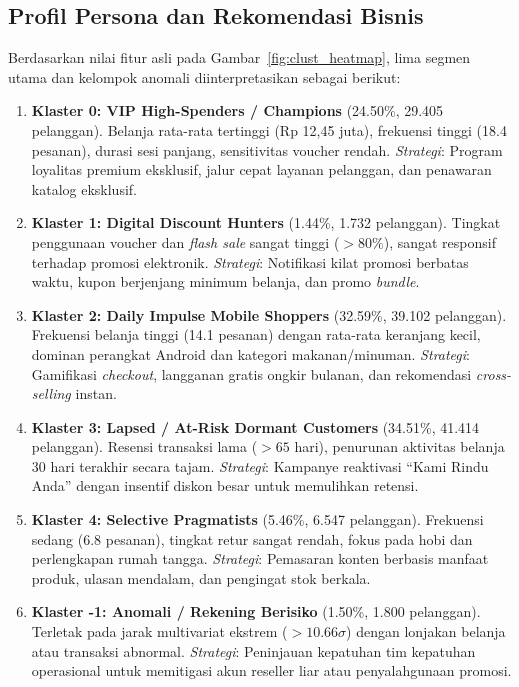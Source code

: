 \documentclass[11pt,a4paper]{article}
\begin{document}
\subsection{Profil Persona dan Rekomendasi Bisnis}
Berdasarkan nilai fitur asli pada Gambar~\ref{fig:clust_heatmap}, lima segmen utama dan kelompok anomali diinterpretasikan sebagai berikut:
\begin{enumerate}
    \item \textbf{Klaster 0: VIP High-Spenders / Champions} (24.50\%, 29.405 pelanggan). Belanja rata-rata tertinggi (Rp 12,45 juta), frekuensi tinggi (18.4 pesanan), durasi sesi panjang, sensitivitas voucher rendah. \textit{Strategi}: Program loyalitas premium eksklusif, jalur cepat layanan pelanggan, dan penawaran katalog eksklusif.
    \item \textbf{Klaster 1: Digital Discount Hunters} (1.44\%, 1.732 pelanggan). Tingkat penggunaan voucher dan \textit{flash sale} sangat tinggi ($>80\%$), sangat responsif terhadap promosi elektronik. \textit{Strategi}: Notifikasi kilat promosi berbatas waktu, kupon berjenjang minimum belanja, dan promo \textit{bundle}.
    \item \textbf{Klaster 2: Daily Impulse Mobile Shoppers} (32.59\%, 39.102 pelanggan). Frekuensi belanja tinggi (14.1 pesanan) dengan rata-rata keranjang kecil, dominan perangkat Android dan kategori makanan/minuman. \textit{Strategi}: Gamifikasi \textit{checkout}, langganan gratis ongkir bulanan, dan rekomendasi \textit{cross-selling} instan.
    \item \textbf{Klaster 3: Lapsed / At-Risk Dormant Customers} (34.51\%, 41.414 pelanggan). Resensi transaksi lama ($>65$ hari), penurunan aktivitas belanja 30 hari terakhir secara tajam. \textit{Strategi}: Kampanye reaktivasi ``Kami Rindu Anda'' dengan insentif diskon besar untuk memulihkan retensi.
    \item \textbf{Klaster 4: Selective Pragmatists} (5.46\%, 6.547 pelanggan). Frekuensi sedang (6.8 pesanan), tingkat retur sangat rendah, fokus pada hobi dan perlengkapan rumah tangga. \textit{Strategi}: Pemasaran konten berbasis manfaat produk, ulasan mendalam, dan pengingat stok berkala.
    \item \textbf{Klaster -1: Anomali / Rekening Berisiko} (1.50\%, 1.800 pelanggan). Terletak pada jarak multivariat ekstrem ($>10.66\sigma$) dengan lonjakan belanja atau transaksi abnormal. \textit{Strategi}: Peninjauan kepatuhan tim kepatuhan operasional untuk memitigasi akun reseller liar atau penyalahgunaan promosi.
\end{enumerate}
\end{document}
